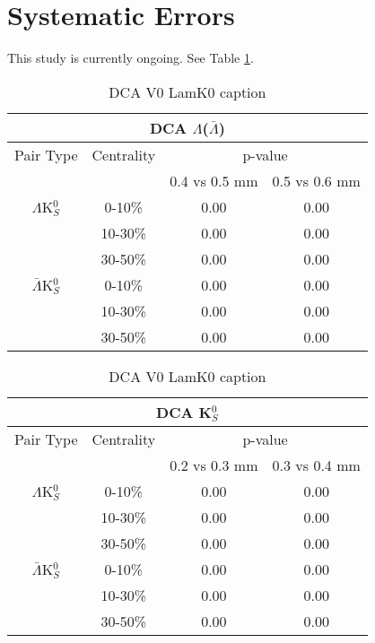 \section{Systematic Errors}
\label{SystematicErrors}

This study is currently ongoing.  See Table \ref{tab:LamDcaLamK0}.

\begin{table}
 \centering
 \begin{tabular}{|c|c|c|c|}
  \multicolumn{4}{c}{DCA $\Lambda$($\bar{\Lambda}$)} \\
  \hline
  Pair Type & Centrality & \multicolumn{2}{c|}{p-value} \\
  \cline{3-4}
   & & 0.4 vs 0.5 mm & 0.5 vs 0.6 mm \\
  \hline
  $\Lambda$K$^{0}_{S}$ & 0-10\% & 0.00 & 0.00 \\
   & 10-30\% & 0.00 & 0.00 \\
   & 30-50\% & 0.00 &0.00 \\
  \hline
  $\bar{\Lambda}$K$^{0}_{S}$ & 0-10\% & 0.00 & 0.00 \\
   & 10-30\% & 0.00 & 0.00 \\
   & 30-50\% & 0.00 & 0.00 \\
  \hline
 \end{tabular}
 \caption{DCA V0 LamK0 caption}
 \label{tab:LamDcaLamK0}
\end{table}

\begin{table}
 \centering
 \begin{tabular}{|c|c|c|c|}
  \multicolumn{4}{c}{DCA K$^{0}_{S}$} \\
  \hline
  Pair Type & Centrality & \multicolumn{2}{c|}{p-value} \\
  \cline{3-4}
   & & 0.2 vs 0.3 mm & 0.3 vs 0.4 mm \\
  \hline
  $\Lambda$K$^{0}_{S}$ & 0-10\% & 0.00 & 0.00 \\
   & 10-30\% & 0.00 & 0.00 \\
   & 30-50\% & 0.00 &0.00 \\
  \hline
  $\bar{\Lambda}$K$^{0}_{S}$ & 0-10\% & 0.00 & 0.00 \\
   & 10-30\% & 0.00 & 0.00 \\
   & 30-50\% & 0.00 & 0.00 \\
  \hline
 \end{tabular}
 \caption{DCA V0 LamK0 caption}
 \label{tab:K0DcaLamK0}
\end{table}

